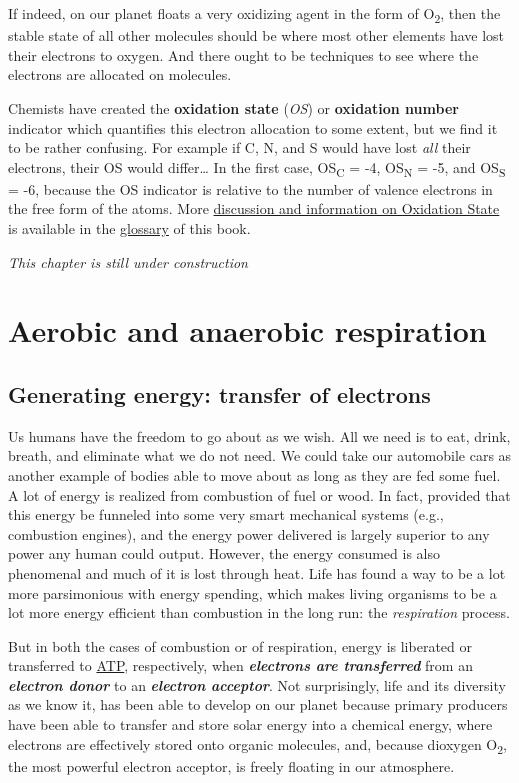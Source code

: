\documentclass[]{book}
\theoremstyle{definition}
\theoremstyle{definition}
\theoremstyle{definition}
\theoremstyle{remark}
\begin{document}
If indeed, on our planet floats a very oxidizing agent in the form of
O\textsubscript{2}, then the stable state of all other molecules should
be where most other elements have lost their electrons to oxygen. And
there ought to be techniques to see where the electrons are allocated on
molecules.

Chemists have created the \textbf{oxidation state} (\emph{OS}) or
\textbf{oxidation number} indicator which quantifies this electron
allocation to some extent, but we find it to be rather confusing. For
example if C, N, and S would have lost \emph{all} their electrons, their
OS would differ\ldots{} In the first case, OS\textsubscript{C} = -4,
OS\textsubscript{N} = -5, and OS\textsubscript{S} = -6, because the OS
indicator is relative to the number of valence electrons in the free
form of the atoms. More \protect\hyperlink{oxidation-state}{discussion
and information on Oxidation State} is available in the
\protect\hyperlink{glossary}{glossary} of this book.

\emph{This chapter is still under construction}

\chapter{Aerobic and anaerobic
respiration}\label{aerobic-and-anaerobic-respiration}

\section{Generating energy: transfer of
electrons}\label{generating-energy-transfer-of-electrons}

Us humans have the freedom to go about as we wish. All we need is to
eat, drink, breath, and eliminate what we do not need. We could take our
automobile cars as another example of bodies able to move about as long
as they are fed some fuel. A lot of energy is realized from combustion
of fuel or wood. In fact, provided that this energy be funneled into
some very smart mechanical systems (e.g., combustion engines), and the
energy power delivered is largely superior to any power any human could
output. However, the energy consumed is also phenomenal and much of it
is lost through heat. Life has found a way to be a lot more parsimonious
with energy spending, which makes living organisms to be a lot more
energy efficient than combustion in the long run: the \emph{respiration}
process.

But in both the cases of combustion or of respiration, energy is
liberated or transferred to \protect\hyperlink{ATP}{ATP}, respectively,
when \emph{\textbf{electrons are transferred}} from an
\emph{\textbf{electron donor}} to an \emph{\textbf{electron acceptor}}.
Not surprisingly, life and its diversity as we know it, has been able to
develop on our planet because primary producers have been able to
transfer and store solar energy into a chemical energy, where electrons
are effectively stored onto organic molecules, and, because dioxygen
O\textsubscript{2}, the most powerful electron acceptor, is freely
floating in our atmosphere.
\end{document}
